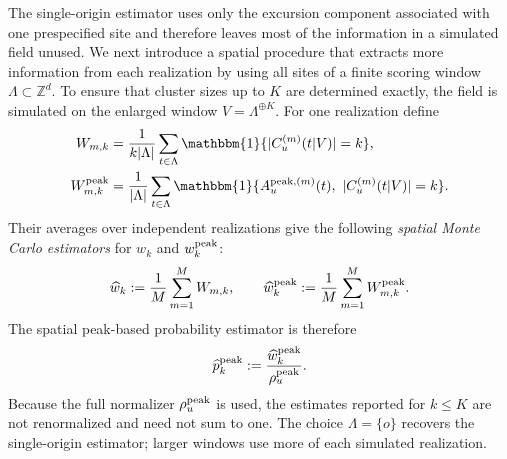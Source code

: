 \documentclass[aap,preprint]{imsart}
\theoremstyle{plain}
\theoremstyle{definition}
\def\Z{{\mathbb Z}}
\begin{document}
The single-origin estimator uses only the excursion component associated with one prespecified site and therefore leaves most of the information in a simulated field unused. We next introduce a spatial procedure that extracts more information from each realization by using all sites of a finite scoring window $\Lambda\subset\Z^d$. To ensure that cluster sizes up to $K$ are determined exactly, the field is simulated on the enlarged window $V=\Lambda^{\oplus K}$. For one realization define
\begin{align}
	W_{m,k}
	&=\frac{1}{k|\Lambda|}\sum_{t\in\Lambda}
	\mathbbm{1}\{|C_u^{(m)}(t|V)|=k\},
	\label{eq:MC2}\\
	W_{m,k}^{{\rm peak}}
	&=\frac{1}{|\Lambda|}\sum_{t\in\Lambda}
	\mathbbm{1}\{A_u^{{\rm peak},(m)}(t),\ |C_u^{(m)}(t|V)|=k\}.
	\label{eq:MC3}
\end{align}
Their averages over independent realizations give the following \textit{spatial Monte Carlo estimators} for $w_k$ and $w_k^{\rm peak}$:
\begin{equation}\label{eq:wk-estimate}
	\widehat w_k:=\frac1M\sum_{m=1}^M W_{m,k},
	\qquad
	\widehat w_k^{\rm peak}:=\frac1M\sum_{m=1}^M W_{m,k}^{\rm peak}.
\end{equation}
The spatial peak-based probability estimator is therefore
\begin{equation*}
	\widehat p_k^{\rm peak}
	:=\frac{\widehat w_k^{\rm peak}}{\rho_u^{\rm peak}}.
\end{equation*}
Because the full normalizer $\rho_u^{\rm peak}$ is used, the estimates reported for $k\leq K$ are not renormalized and need not sum to one. The choice $\Lambda=\{o\}$ recovers the single-origin estimator; larger
windows use more of each simulated realization.
\end{document}
